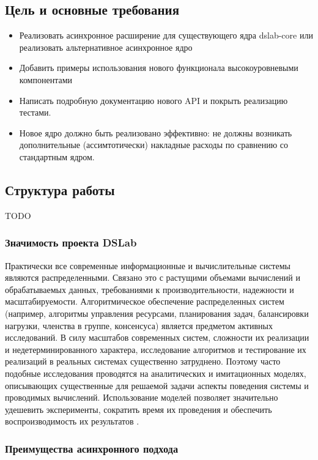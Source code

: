 \subsection{Цель и основные требования}
\begin{itemize}
    \item Реализовать асинхронное расширение для существующего ядра dslab-core или реализовать альтернативное асинхронное ядро 
    \item Добавить примеры использования нового функционала высокоуровневыми компонентами
    \item Написать подробную документацию нового API и покрыть реализацию тестами.
    \item Новое ядро должно быть реализовано эффективно: не должны возникать дополнительные (ассимтотически) накладные расходы по сравнению со стандартным ядром.
\end{itemize}

\subsection{Структура работы}

TODO 

\subsubsection{Значимость проекта DSLab}

Практически все современные информационные и вычислительные системы являются распределенными. Связано это с растущими объемами вычислений и обрабатываемых данных, требованиями к производительности, надежности и масштабируемости. Алгоритмическое обеспечение распределенных систем (например, алгоритмы управления ресурсами, планирования задач, балансировки нагрузки, членства в группе, консенсуса) является предметом активных исследований. В силу масштабов современных систем, сложности их реализации и недетерминированного характера, исследование алгоритмов и тестирование их реализаций в реальных системах существенно затруднено. Поэтому часто подобные исследования проводятся на аналитических и имитационных моделях, описывающих существенные для решаемой задачи аспекты поведения системы и проводимых вычислений. Использование моделей позволяет значительно удешевить эксперименты, сократить время их проведения и обеспечить воспроизводимость их результатов \cite{dslab-description}. 

\subsubsection{Преимущества асинхронного подхода}

